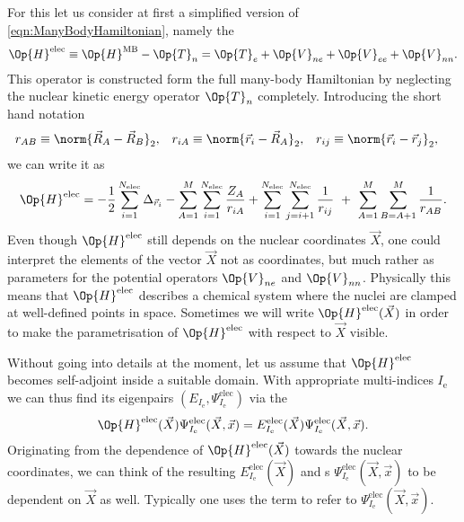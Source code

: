 For this let us consider at first
a simplified version of \eqref{eqn:ManyBodyHamiltonian},
namely the 
\[
	\Op{H}^\text{elec} \equiv \Op{H}^\text{MB} - \Op{T}_n
	= \Op{T}_e + \Op{V}_{ne} + \Op{V}_{ee} + \Op{V}_{nn}.
\]
This operator is constructed form the full many-body Hamiltonian
by neglecting the nuclear kinetic energy operator $\Op{T}_n$ completely.
Introducing the short hand notation
\begin{align*}
r_{AB} &\equiv \norm{\vec{R}_A - \vec{R}_B}_2, &
r_{iA} &\equiv \norm{\vec{r}_i - \vec{R}_A}_2, &
r_{ij} &\equiv \norm{\vec{r}_i - \vec{r}_j}_2, &
\end{align*}
we can write it as
\begin{equation}
	\Op{H}^\text{elec}
	= - \frac12 \sum_{i=1}^{\Nelec} \Delta_{\vec{r}_i}
	- \sum_{A=1}^M \sum_{i=1}^{\Nelec} \frac{Z_A}{r_{iA}}
	+ \sum_{i=1}^{\Nelec} \sum_{j=i+1}^{\Nelec} \frac{1}{r_{ij}}
	\  + \  %
	\sum_{A=1}^{M} \sum_{B=A+1}^{M} \frac{1}{r_{AB}}.
	\label{eqn:ElectronicFullHamiltonian}
\end{equation}
Even though $\Op{H}^\text{elec}$ still depends on the nuclear coordinates $\vec{X}$,
one could interpret the elements of the vector
$\vec{X}$ not as coordinates,
but much rather as parameters for the potential operators $\Op{V}_{ne}$ and $\Op{V}_{nn}$.
Physically this means that $\Op{H}^\text{elec}$ describes a chemical system
where the nuclei are clamped at well-defined points in space.
Sometimes we will write $\Op{H}^\text{elec}(\vec{X})$
in order to make the parametrisation of $\Op{H}^\text{elec}$ with respect to $\vec{X}$
visible.

\newcommand{\Iel}{I_\text{e}}
\newcommand{\Inu}{I_\text{n}}
Without going into details at the moment,
let us assume that $\Op{H}^\text{elec}$ becomes self-adjoint
inside a suitable domain.
With appropriate multi-indices $\Iel$
we can thus find its eigenpairs $(E_{\Iel}, \Psi^\text{elec}_{\Iel})$
via the 
\begin{equation}
	\Op{H}^\text{elec}(\vec{X}) \Psi^\text{elec}_{\Iel}(\vec{X}, \vec{x})
	= E^\text{elec}_{\Iel}(\vec{X})
		\Psi^\text{elec}_{\Iel}(\vec{X}, \vec{x}).
	\label{eqn:ElectronicSchrödinger}
\end{equation}
Originating from the dependence of $\Op{H}^\text{elec}(\vec{X})$
towards the nuclear coordinates,
we can think of the resulting 
$E^\text{elec}_{\Iel}(\vec{X})$
and s $\Psi^\text{elec}_{\Iel}(\vec{X}, \vec{x})$
to be dependent on $\vec{X}$ as well.
Typically one uses the term 
to refer to $\Psi^\text{elec}_{\Iel}(\vec{X}, \vec{x})$.


